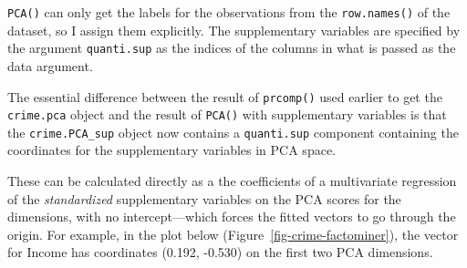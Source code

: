 \documentclass[
  letterpaper,
  10pt,
  krantz2]{krantz}
\makeatletter
\newenvironment{Shaded}{\begin{snugshade}}{\end{snugshade}}
\newcommand{\AttributeTok}[1]{\textcolor[rgb]{0.40,0.45,0.13}{#1}}
\newcommand{\ConstantTok}[1]{\textcolor[rgb]{0.56,0.35,0.01}{#1}}
\newcommand{\DecValTok}[1]{\textcolor[rgb]{0.68,0.00,0.00}{#1}}
\newcommand{\FunctionTok}[1]{\textcolor[rgb]{0.28,0.35,0.67}{#1}}
\newcommand{\NormalTok}[1]{\textcolor[rgb]{0.00,0.23,0.31}{#1}}
\newcommand{\OtherTok}[1]{\textcolor[rgb]{0.00,0.23,0.31}{#1}}
\newcommand{\SpecialCharTok}[1]{\textcolor[rgb]{0.37,0.37,0.37}{#1}}
\newenvironment{kframe}{%
  \medskip{}
  \setlength{\fboxsep}{.8em}
  \def\at@end@of@kframe{}%
  \ifinner\ifhmode%
  \def\at@end@of@kframe{\end{minipage}}%
  \begin{minipage}{\columnwidth}%
  \fi\fi%
  \def\FrameCommand##1{\hskip\@totalleftmargin \hskip-\fboxsep
  \colorbox{shadecolor}{##1}\hskip-\fboxsep
      \hskip-\linewidth \hskip-\@totalleftmargin \hskip\columnwidth}%
  \MakeFramed {\advance\hsize-\width
    \@totalleftmargin\z@ \linewidth\hsize
    \@setminipage}}%
{\par\unskip\endMakeFramed%
  \at@end@of@kframe}
\renewenvironment{Shaded}{\begin{kframe}}{\end{kframe}}
\makeatother
\begin{document}
\texttt{PCA()} can only get the labels for the observations from the
\texttt{row.names()} of the dataset, so I assign them explicitly. The
supplementary variables are specified by the argument
\texttt{quanti.sup} as the indices of the columns in what is passed as
the data argument.

\begin{Shaded}
\end{Shaded}

The essential difference between the result of \texttt{prcomp()} used
earlier to get the \texttt{crime.pca} object and the result of
\texttt{PCA()} with supplementary variables is that the
\texttt{crime.PCA\_sup} object now contains a \texttt{quanti.sup}
component containing the coordinates for the supplementary variables in
PCA space.

These can be calculated directly as a the coefficients of a multivariate
regression of the \emph{standardized} supplementary variables on the PCA
scores for the dimensions, with no intercept---which forces the fitted
vectors to go through the origin. For example, in the plot below
(Figure~\ref{fig-crime-factominer}), the vector for Income has
coordinates (0.192, -0.530) on the first two PCA dimensions.
\end{document}
